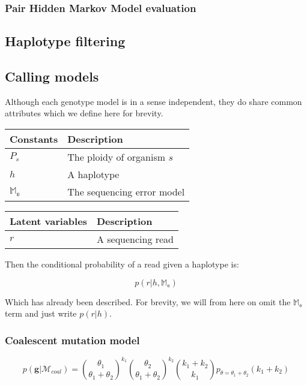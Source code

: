 \documentclass{article}
\begin{document}
\subsubsection{Pair Hidden Markov Model evaluation}

\subsection{Haplotype filtering}

\subsection{Calling models}

Although each genotype model is in a sense independent, they do share common attributes which we define here for brevity.

\begin{center}
\begin{tabular}{ll}
Constants & Description \\
\hline
$P_s$ & The ploidy of organism $s$\\
$h$ & A haplotype \\
$\mathbb{M_{e}}$ & The sequencing error model \\
\hline
\end{tabular}
\end{center}

\begin{center}
\begin{tabular}{ll}
Latent variables & Description \\
\hline
$r$ & A sequencing read \\
\hline
\end{tabular}
\end{center}

Then the conditional probability of a read given a haplotype is:

\begin{equation}
\label{eq:read_prob}
    p(r | h, \mathbb{M_{e}})
\end{equation}

Which has already been described. For brevity, we will from here on omit the $\mathbb{M_{e}}$ term and just write $p(r | h)$.

\subsubsection{Coalescent mutation model}

\begin{equation*}
    p(\boldsymbol{g} | \mathcal{M}_{coal}) = \binom{\theta_1}{\theta_1 + \theta_2}^{k_1} \binom{\theta_2}{\theta_1 + \theta_2}^{k_2} \binom{k_1 + k_2}{k_1} p_{\theta = \theta_1 + \theta_2} (k_1 + k_2)
\end{equation*}
\end{document}
